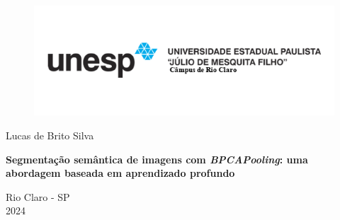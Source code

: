 \begin{titlepage}
    \begin{figure}[H]
        \centering
        \includegraphics[width=1\linewidth]{recursos/imagens/capa/unesp.png}
    \end{figure}
   \begin{center}

       \vspace*{1cm}

       \Large Lucas de Brito Silva

       \vspace*{2.3cm}
       
       \textbf{Segmentação semântica de imagens com \textit{BPCAPooling}: uma abordagem baseada em aprendizado profundo}
       \normalsize
       
       \vspace{1.5cm}


       \vfill
            
       Rio Claro - SP \\
       2024
            
   \end{center}
\end{titlepage}